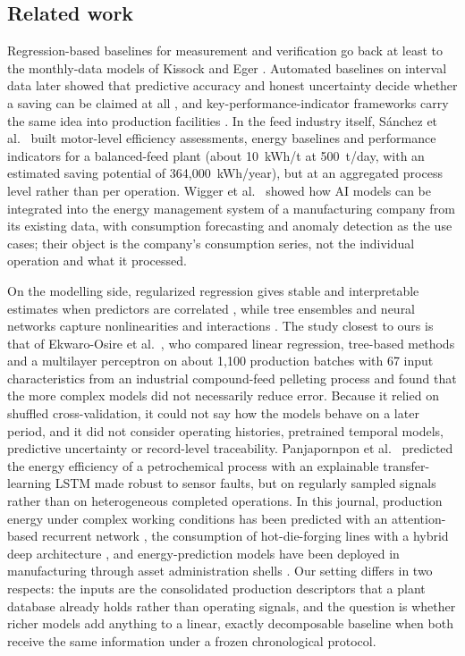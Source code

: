 \subsection{Related work}\label{sec:related}
Regression-based baselines for measurement and verification go back at least to the monthly-data models of Kissock and Eger \citep{kissock2008}. Automated baselines on interval data later showed that predictive accuracy and honest uncertainty decide whether a saving can be claimed at all \citep{granderson2016,gallagher2018}, and key-performance-indicator frameworks carry the same idea into production facilities \citep{cosgrove2018}. In the feed industry itself, S\'anchez et al.\ \citep{sanchez2020} built motor-level efficiency assessments, energy baselines and performance indicators for a balanced-feed plant (about 10~kWh/t at 500~t/day, with an estimated saving potential of 364,000~kWh/year), but at an aggregated process level rather than per operation. Wigger et al.\ \citep{wigger2025} showed how AI models can be integrated into the energy management system of a manufacturing company from its existing data, with consumption forecasting and anomaly detection as the use cases; their object is the company's consumption series, not the individual operation and what it processed.

On the modelling side, regularized regression gives stable and interpretable estimates when predictors are correlated \citep{hoerl1970}, while tree ensembles and neural networks capture nonlinearities and interactions \citep{friedman2001}. The study closest to ours is that of Ekwaro-Osire et al.\ \citep{ekwaro2025}, who compared linear regression, tree-based methods and a multilayer perceptron on about 1,100 production batches with 67 input characteristics from an industrial compound-feed pelleting process and found that the more complex models did not necessarily reduce error. Because it relied on shuffled cross-validation, it could not say how the models behave on a later period, and it did not consider operating histories, pretrained temporal models, predictive uncertainty or record-level traceability. Panjapornpon et al.\ \citep{panjapornpon2023} predicted the energy efficiency of a petrochemical process with an explainable transfer-learning LSTM made robust to sensor faults, but on regularly sampled signals rather than on heterogeneous completed operations. In this journal, production energy under complex working conditions has been predicted with an attention-based recurrent network \citep{yang2024eaai}, the consumption of hot-die-forging lines with a hybrid deep architecture \citep{wang2026forging}, and energy-prediction models have been deployed in manufacturing through asset administration shells \citep{shin2024eaai}. Our setting differs in two respects: the inputs are the consolidated production descriptors that a plant database already holds rather than operating signals, and the question is whether richer models add anything to a linear, exactly decomposable baseline when both receive the same information under a frozen chronological protocol.

